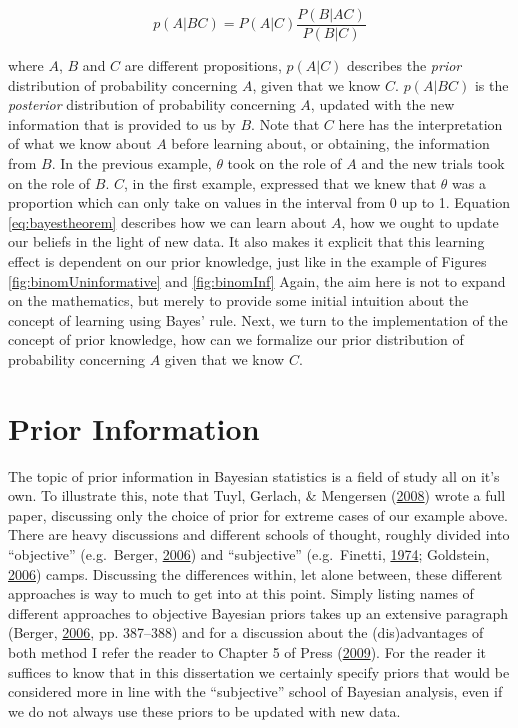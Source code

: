\documentclass[openright,titlepage,12pt,a4paper]{book}
\begin{document}
\begin{equation} 
p(A|BC) = P(A|C)\frac{P(B|AC)}{P(B|C)}
\label{eq:bayestheorem}
\end{equation}

where \(A\), \(B\) and \(C\) are different propositions, \(p(A|C)\) describes the \emph{prior} distribution of probability concerning \(A\), given that we know \(C\). \(p(A|BC)\) is the \emph{posterior} distribution of probability concerning \(A\), updated with the new information that is provided to us by \(B\). Note that \(C\) here has the interpretation of what we know about \(A\) before learning about, or obtaining, the information from \(B\). In the previous example, \(\theta\) took on the role of \(A\) and the new trials took on the role of \(B\). \(C\), in the first example, expressed that we knew that \(\theta\) was a proportion which can only take on values in the interval from 0 up to 1. Equation \eqref{eq:bayestheorem} describes how we can learn about \(A\), how we ought to update our beliefs in the light of new data. It also makes it explicit that this learning effect is dependent on our prior knowledge, just like in the example of Figures \ref{fig:binomUninformative} and \ref{fig:binomInf} Again, the aim here is not to expand on the mathematics, but merely to provide some initial intuition about the concept of learning using Bayes' rule. Next, we turn to the implementation of the concept of prior knowledge, how can we formalize our prior distribution of probability concerning \(A\) given that we know \(C\).

\hypertarget{prior-information}{%
\section{Prior Information}\label{prior-information}}

The topic of prior information in Bayesian statistics is a field of study all on it's own. To illustrate this, note that Tuyl, Gerlach, \& Mengersen (\protect\hyperlink{ref-tuyl_comparison_2008}{2008}) wrote a full paper, discussing only the choice of prior for extreme cases of our example above. There are heavy discussions and different schools of thought, roughly divided into ``objective'' (e.g.~Berger, \protect\hyperlink{ref-berger_case_2006}{2006}) and ``subjective'' (e.g.~Finetti, \protect\hyperlink{ref-de_finetti_theory_1974}{1974}; Goldstein, \protect\hyperlink{ref-goldstein_subjective_2006}{2006}) camps. Discussing the differences within, let alone between, these different approaches is way to much to get into at this point. Simply listing names of different approaches to objective Bayesian priors takes up an extensive paragraph (Berger, \protect\hyperlink{ref-berger_case_2006}{2006}, pp. 387--388) and for a discussion about the (dis)advantages of both method I refer the reader to Chapter 5 of Press (\protect\hyperlink{ref-press_subjective_2009}{2009}). For the reader it suffices to know that in this dissertation we certainly specify priors that would be considered more in line with the ``subjective'' school of Bayesian analysis, even if we do not always use these priors to be updated with new data.
\end{document}
